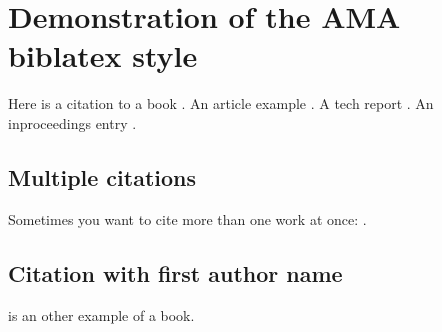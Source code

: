 \documentclass[a4paper,12pt]{article}
\begin{document}
\section*{Demonstration of the AMA biblatex style}

Here is a citation to a book \cite{whole-collection}.  
An article example \parencite{article-minimal}.  
A tech report \cite{techreport-minimal}.  
An inproceedings entry \cite{inproceedings-full}.  

\subsection*{Multiple citations}
Sometimes you want to cite more than one work at once:  
\parencite{article-minimal,techreport-minimal,whole-collection}.

\subsection*{Citation with first author name}
\textcite{Lamport:Book:1989} is an other example of a book.

\printbibliography
\end{document}
